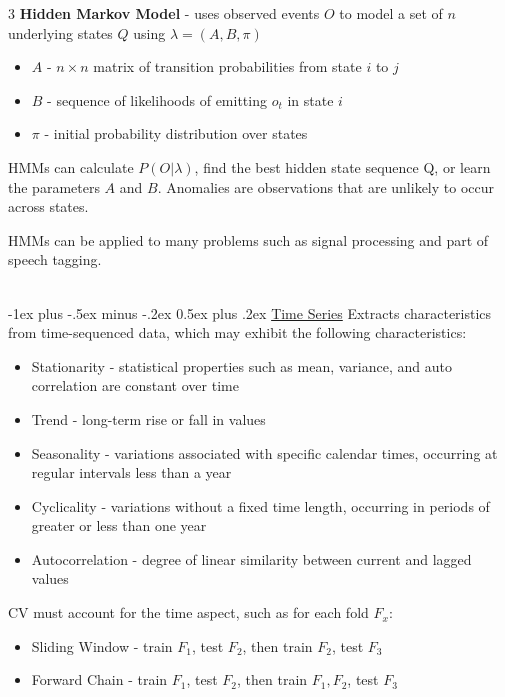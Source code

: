 \documentclass[10pt,landscape,letterpaper]{article}
\makeatletter
\renewcommand{\section}{\@startsection{section}{1}{0mm}%
                                {-1ex plus -.5ex minus -.2ex}%
                                {0.5ex plus .2ex}%
                                {\normalfont\large\bfseries}}
\makeatother
\begin{document}
\begin{multicols}{3}
\textbf{Hidden Markov Model} - uses observed events $O$ to model a set of $n$ underlying states $Q$ using $\lambda = (A,B,\pi)$
\begin{itemize}[label={--},leftmargin=4mm]
\itemsep -.4mm
\item $A$ - $n\times n$ matrix of transition probabilities from state $i$ to $j$ \item $B$ - sequence of likelihoods of emitting $o_t$ in state $i$
\item $\pi$ - initial probability distribution over states
\end{itemize}
HMMs can calculate $P(O|\lambda)$, find the best hidden state sequence Q, or learn the parameters $A$ and $B$.
Anomalies are observations that are unlikely to occur across states.

\smallskip
HMMs can be applied to many problems such as signal processing and part of speech tagging.

\columnbreak
\textcolor{white}{.}\vspace{-5mm}\\ %
\section{\href{https://migue-rc.github.io/Data-Science-Cheatsheet/\#time-series}{Time Series}}
Extracts characteristics from time-sequenced data, which may exhibit the following characteristics:
\begin{itemize}[label={--},leftmargin=4mm]
\itemsep -.4mm
\item Stationarity - statistical properties such as mean, variance, and auto correlation are constant over time
\item Trend - long-term rise or fall in values
\item Seasonality - variations associated with specific calendar times, occurring at regular intervals less than a year
\item Cyclicality - variations without a fixed time length, occurring in periods of greater or less than one year
\item Autocorrelation - degree of linear similarity between current and lagged values
\end{itemize}


CV must account for the time aspect, such as for each fold $F_x$:
\begin{itemize}[label={--},leftmargin=4mm]
\itemsep -.4mm
\item Sliding Window - train $F_1$, test $F_2$, then train $F_2$, test $F_3$
\item Forward Chain - train $F_1$, test $F_2$, then train $F_1, F_2$, test $F_3$
\end{itemize}


\end{multicols}
\end{document}
